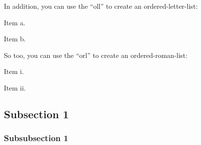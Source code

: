   In addition, you can use the ``oll'' to create an ordered-letter-list:
  \begin{oll}
    \item Item a.
    \item Item b.
  \end{oll}

  So too, you can use the ``orl'' to create an ordered-roman-list:
  \begin{orl}
    \item Item i.
    \item Item ii.
  \end{orl}

  \subsection{Subsection 1}

    \lipsum[1-6]

    \subsubsection{Subsubsection 1}

      \lipsum
      \lipsum[1]
      \pagebreak
